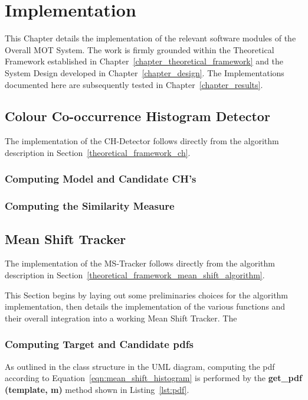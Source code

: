 \chapter{Implementation}\label{chapter_implementation}

This Chapter details the implementation of the relevant software modules of the
Overall MOT System. The work is firmly grounded within the Theoretical Framework
established in Chapter~\ref{chapter_theoretical_framework} and the System Design
developed in Chapter~\ref{chapter_design}. The Implementations documented here
are subsequently tested in Chapter~\ref{chapter_results}.


\section{Colour Co-occurrence Histogram Detector}\label{implementation_ch}
The implementation of the CH-Detector follows directly from the algorithm
description in Section~\ref{theoretical_framework_ch}.

\subsection{Computing Model and Candidate CH's}


\subsection{Computing the Similarity Measure}


\section{Mean Shift Tracker}\label{implementation_mean_shift_tracker}
The implementation of the MS-Tracker follows directly from the algorithm
description in Section~\ref{theoretical_framework_mean_shift_algorithm}.

This Section begins by laying out some preliminaries choices for the algorithm
implementation, then details the implementation of the various functions and
their overall integration into a working Mean Shift Tracker. The  

\subsection{Computing Target and Candidate pdfs}
As outlined in the class structure in the UML diagram, %
computing the pdf according to Equation~\ref{eqn:mean_shift_histogram} is
performed by the \textbf{get\_pdf (template, m)} method shown in
Listing~\ref{lst:pdf}.

